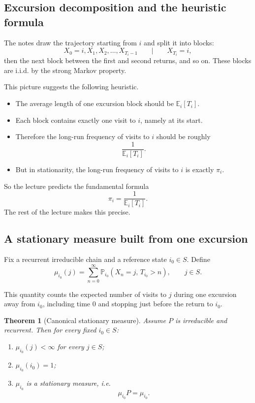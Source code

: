 \documentclass[11pt]{article}
\newtheorem{theorem}{Theorem}[section]
\theoremstyle{definition}
\begin{document}
\subsection{Excursion decomposition and the heuristic formula}

The notes draw the trajectory starting from \(i\) and split it into blocks:
\[
X_0=i, X_1,X_2,\dots,X_{T_i-1}
\qquad\Big|\qquad
X_{T_i}=i,
\]
then the next block between the first and second returns, and so on. These blocks are i.i.d. by the strong Markov property.

This picture suggests the following heuristic.

\begin{itemize}[leftmargin=2em]
    \item The average length of one excursion block should be \(\mathbb E_i[T_i]\).
    \item Each block contains exactly one visit to \(i\), namely at its start.
    \item Therefore the long-run frequency of visits to \(i\) should be roughly
    \[
    \frac{1}{\mathbb E_i[T_i]}.
    \]
    \item But in stationarity, the long-run frequency of visits to \(i\) is exactly \(\pi_i\).
\end{itemize}

So the lecture predicts the fundamental formula
\[
\pi_i = \frac{1}{\mathbb E_i[T_i]}.
\]
The rest of the lecture makes this precise.

\subsection{A stationary measure built from one excursion}

Fix a recurrent irreducible chain and a reference state \(i_0\in S\). Define
\[
\mu_{i_0}(j)
=
\sum_{n=0}^{\infty}
\mathbb P_{i_0}(X_n=j,\,T_{i_0}>n),
\qquad j\in S.
\]

This quantity counts the expected number of visits to \(j\) during one excursion away from \(i_0\), including time \(0\) and stopping just before the return to \(i_0\).

\begin{theorem}[Canonical stationary measure]
Assume \(P\) is irreducible and recurrent. Then for every fixed \(i_0\in S\):
\begin{enumerate}[label=(\roman*)]
    \item \(\mu_{i_0}(j)<\infty\) for every \(j\in S\);
    \item \(\mu_{i_0}(i_0)=1\);
    \item \(\mu_{i_0}\) is a stationary measure, i.e.
    \[
    \mu_{i_0}P = \mu_{i_0}.
    \]
\end{enumerate}
\end{theorem}
\end{document}

